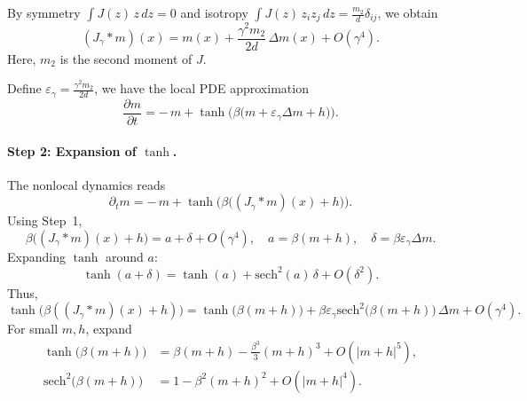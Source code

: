 \documentclass[11pt,a4paper]{article}
\begin{document}
By symmetry $\int J(z)\,z\,dz = 0$ and isotropy 
$\int J(z)\, z_i z_j\,dz = \frac{m_2}{d}\delta_{ij}$, we obtain
\begin{equation}
    (J_\gamma * m)(x) = m(x) + \frac{\gamma^2 m_2}{2d}\,\Delta m(x) + O(\gamma^4).
\end{equation}
Here, $m_2$ is the second moment of $J$.

Define $\varepsilon_\gamma = \frac{\gamma^2 m_2}{2d}$, we have the local PDE approximation
\begin{equation}
    \label{eq:local_tanh}
    \frac{\partial m}{\partial t} = -\,m + \tanh\!\Big(\beta\big(m + \varepsilon_\gamma \Delta m + h\big)\Big).
\end{equation}

\paragraph{Step 2: Expansion of $\tanh$.}
The nonlocal dynamics reads
\begin{equation}
\partial_t m = -\,m + \tanh\!\Big(\beta\big((J_\gamma * m)(x) + h\big)\Big).
\end{equation}
Using Step~1,
\begin{equation}  
\beta\big((J_\gamma*m)(x) + h\big) = a + \delta + O(\gamma^4),
\quad a = \beta(m+h), \quad \delta = \beta \varepsilon_\gamma \Delta m.
\end{equation}
Expanding $\tanh$ around $a$:
\begin{equation}
\tanh(a+\delta) 
= \tanh(a) + \text{sech}^2(a)\,\delta + O(\delta^2).
\end{equation}
Thus,
\begin{equation}
\tanh\!\Big(\beta((J_\gamma*m)(x) + h)\Big) 
= \tanh\!\big(\beta(m+h)\big) 
+ \beta \varepsilon_\gamma \text{sech}^2\!\big(\beta(m+h)\big)\,\Delta m
+ O(\gamma^4).
\end{equation}
For small $m,h$, expand
\begin{equation}
    \begin{split}
\tanh\!\big(\beta(m+h)\big) 
&= \beta(m+h) - \frac{\beta^3}{3}(m+h)^3 + O(|m+h|^5),\\
\text{sech}^2\!\big(\beta(m+h)\big) 
&= 1 - \beta^2(m+h)^2 + O(|m+h|^4).
    \end{split}
\end{equation}
\end{document}
